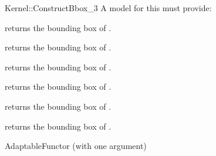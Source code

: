 \begin{ccRefFunctionObjectConcept}{Kernel::ConstructBbox_3}
A model for this must provide:



 {returns the bounding box of .}

 {returns the bounding box of .}

 {returns the bounding box of .}

 {returns the bounding box of .}

 {returns the bounding box of .}

 {returns the bounding box of .}


\ccRefines
AdaptableFunctor (with one argument)



\end{ccRefFunctionObjectConcept}
